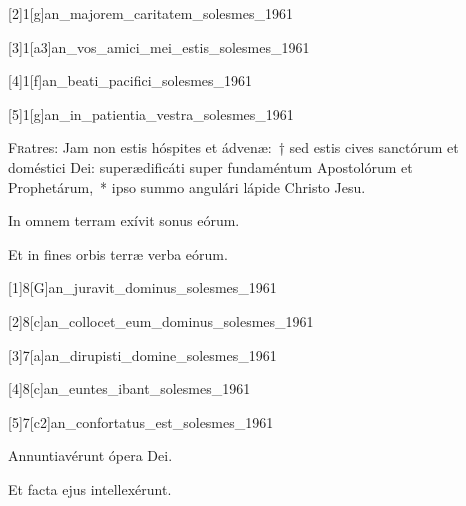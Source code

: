 \documentclass[vesperale_romanum.tex]{subfiles}
\begin{document}
[2]{1}[g]{an_majorem_caritatem_solesmes_1961} %

[3]{1}[a3]{an_vos_amici_mei_estis_solesmes_1961} 

[4]{1}[f]{an_beati_pacifici_solesmes_1961}

[5]{1}[g]{an_in_patientia_vestra_solesmes_1961}

\label{cap_apostolorum}


\lettrine{F}{r}atres: Jam non estis hóspites et ádvenæ:~† sed estis cives san\-ctórum et doméstici Dei: superædificáti super fundaméntum Apostolórum et Prophetárum,~* i\-pso summo angulári lápide Christo Jesu.

\label{hy_exsultet_orbis_gaudiis_solesmes_1961} 

\hymnus
{}


 \vv In omnem terram exívit sonus eórum.
 
 \rr Et in fines orbis terræ verba eórum.



\label{2_vesperis_commune_apostolorum} 
{}

[1]{8}[G]{an_juravit_dominus_solesmes_1961}

[2]{8}[c]{an_collocet_eum_dominus_solesmes_1961}

[3]{7}[a]{an_dirupisti_domine_solesmes_1961}

[4]{8}[c]{an_euntes_ibant_solesmes_1961}

[5]{7}[c2]{an_confortatus_est_solesmes_1961}


 \vv Annuntiavérunt ópera Dei.
 
 \rr Et facta ejus intellexérunt.

\end{document}
